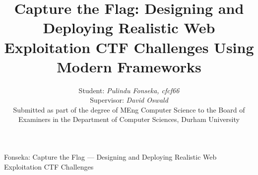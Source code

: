 \documentclass[10pt,journal,compsoc]{IEEEtran}
\begin{document}
\title{Capture the Flag: Designing and Deploying
Realistic Web Exploitation CTF Challenges Using
Modern Frameworks}


\author{Student: \textit{Pulindu Fonseka, cfcf66}\\
Supervisor: \textit{David Oswald}\\
Submitted as part of the degree of MEng Computer Science to the
Board of Examiners in the Department of Computer Sciences, Durham University
}

% 
%



%
{Fonseka: Capture the Flag --- Designing and Deploying Realistic Web Exploitation CTF Challenges}
% 



\end{document}
